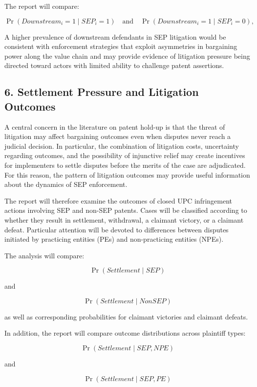 \documentclass[12pt]{article}
\begin{document}
The report will compare:

\[
\Pr(Downstream_i = 1 \mid SEP_i = 1)
\quad \text{and} \quad
\Pr(Downstream_i = 1 \mid SEP_i = 0),
\]


A higher prevalence of downstream defendants in SEP litigation would be consistent with enforcement strategies that exploit asymmetries in bargaining power along the value chain and may provide evidence of litigation pressure being directed toward actors with limited ability to challenge patent assertions.



\subsection*{6. Settlement Pressure and Litigation Outcomes}

A central concern in the literature on patent hold-up is that the threat of litigation may affect bargaining outcomes even when disputes never reach a judicial decision. In particular, the combination of litigation costs, uncertainty regarding outcomes, and the possibility of injunctive relief may create incentives for implementers to settle disputes before the merits of the case are adjudicated. For this reason, the pattern of litigation outcomes may provide useful information about the dynamics of SEP enforcement.

The report will therefore examine the outcomes of closed UPC infringement actions involving SEP and non-SEP patents. Cases will be classified according to whether they result in settlement, withdrawal, a claimant victory, or a claimant defeat. Particular attention will be devoted to differences between disputes initiated by practicing entities (PEs) and non-practicing entities (NPEs).

The analysis will compare:

\[
\Pr(Settlement \mid SEP)
\]

and

\[
\Pr(Settlement \mid NonSEP)
\]


as well as corresponding probabilities for claimant victories and claimant defeats.

In addition, the report will compare outcome distributions across plaintiff types:

\[
\Pr(Settlement \mid SEP, NPE)
\]

and

\[
\Pr(Settlement \mid SEP, PE)
\]
\end{document}
